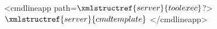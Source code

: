 <cmdlineapp path=$\xmlstructref{server}{toolexec}$?> $\xmlstructref{server}{cmdtemplate}$ </cmdlineapp>
